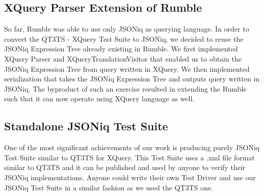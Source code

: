 \subsection{XQuery Parser Extension of Rumble}
So far, Rumble was able to use only JSONiq as querying language. In order to convert the QT3TS - XQuery Test Suite to JSONiq, we decided to reuse the JSONiq Expression Tree already existing in Rumble. We first implemented XQuery Parser and XQueryTranslationVisitor that enabled us to obtain the JSONiq Expression Tree from query written in XQuery. We then implemented serialization that takes the JSONiq Expression Tree and outputs query written in JSONiq. The byproduct of such an exercise resulted in extending the Rumble such that it can now operate using XQuery language as well.

\subsection{Standalone JSONiq Test Suite}
One of the most significant achievements of our work is producing purely JSONiq Test Suite similar to QT3TS for XQuery. This Test Suite uses a .xml file format similar to QT3TS and it can be published and used by anyone to verify their JSONiq implementations. Anyone could write their own Test Driver and use our JSONiq Test Suite in a similar fashion as we used the QT3TS one.

